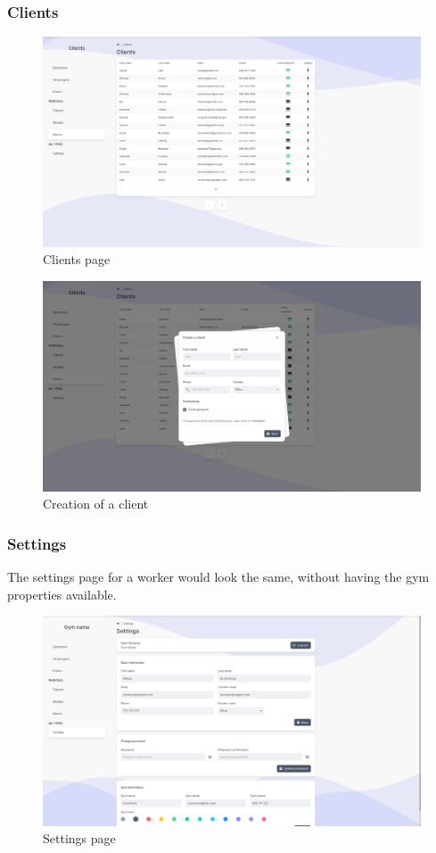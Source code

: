 \documentclass[a4paper, 12pt, oneside]{book}
\begin{document}
\subsubsection{Clients}
\begin{figure}[H]
	\centering
	\includegraphics[width=\textwidth]{assets/core-screenshots/clients.png}
	\caption{Clients page}
\end{figure}
\begin{figure}[H]
	\centering
	\includegraphics[width=\textwidth]{assets/core-screenshots/create-client.png}
	\caption{Creation of a client}
\end{figure}
\subsubsection{Settings}
The settings page for a worker would look the same, without having the gym properties available.
\begin{figure}[H]
	\centering
	\includegraphics[width=\textwidth]{assets/core-screenshots/settings.png}
	\caption{Settings page}
\end{figure}
\end{document}
